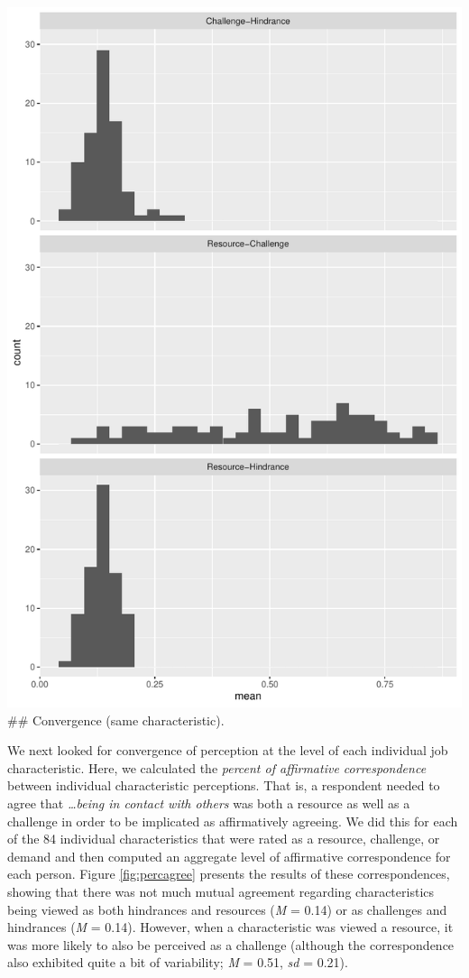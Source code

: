 \documentclass[
  man]{apa6}
\begin{document}
\includegraphics{SIOP2024_agreement_files/figure-latex/percagree-1.pdf}
\#\# Convergence (same characteristic).

We next looked for convergence of perception at the level of each individual job characteristic. Here, we calculated the \emph{percent of affirmative correspondence} between individual characteristic perceptions. That is, a respondent needed to agree that \emph{\ldots being in contact with others} was both a resource as well as a challenge in order to be implicated as affirmatively agreeing. We did this for each of the 84 individual characteristics that were rated as a resource, challenge, or demand and then computed an aggregate level of affirmative correspondence for each person. Figure \ref{fig:percagree} presents the results of these correspondences, showing that there was not much mutual agreement regarding characteristics being viewed as both hindrances and resources (\emph{M} = 0.14) or as challenges and hindrances
(\emph{M} = 0.14). However, when a characteristic was viewed a resource, it was more likely to also be perceived as a challenge (although the correspondence also exhibited quite a bit of variability; \emph{M} = 0.51, \emph{sd} = 0.21).
\end{document}
